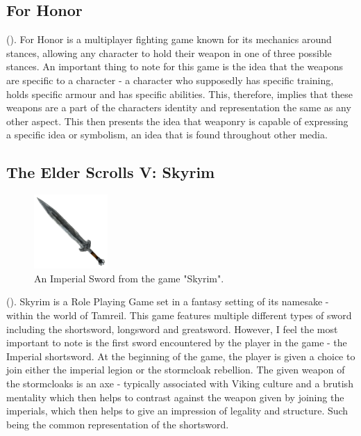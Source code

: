 \documentclass{article}
\begin{document}
\subsection{For Honor}
().
For Honor is a multiplayer fighting game known for its mechanics around stances, allowing any character to hold their weapon in one of three possible stances. An important thing to note for this game is the idea that the weapons are specific to a character - a character who supposedly has specific training, holds specific armour and has specific abilities. This, therefore, implies that these weapons are a part of the characters identity and representation the same as any other aspect. This then presents the idea that weaponry is capable of expressing a specific idea or symbolism, an idea that is found throughout other media.

\subsection{The Elder Scrolls V: Skyrim}
\begin{figure}
    \centering
    \includegraphics[width=0.25\textwidth]{ImperialSword.png}
    \caption{\parencite{imperialSword} An Imperial Sword from the game "Skyrim".
    }
    \label{fig:ImperialSword}
\end{figure}
().
Skyrim is a Role Playing Game set in a fantasy setting of its namesake - within the world of Tamreil. This game features multiple different types of sword including the shortsword, longsword and greatsword. However, I feel the most important to note is the first sword encountered by the player in the game - the Imperial shortsword. At the beginning of the game, the player is given a choice to join either the imperial legion or the stormcloak rebellion. The given weapon of the stormcloaks is an axe - typically associated with Viking culture and a brutish mentality which then helps to contrast against the weapon given by joining the imperials, which then helps to give an impression of legality and structure. Such being the common representation of the shortsword.
\end{document}
